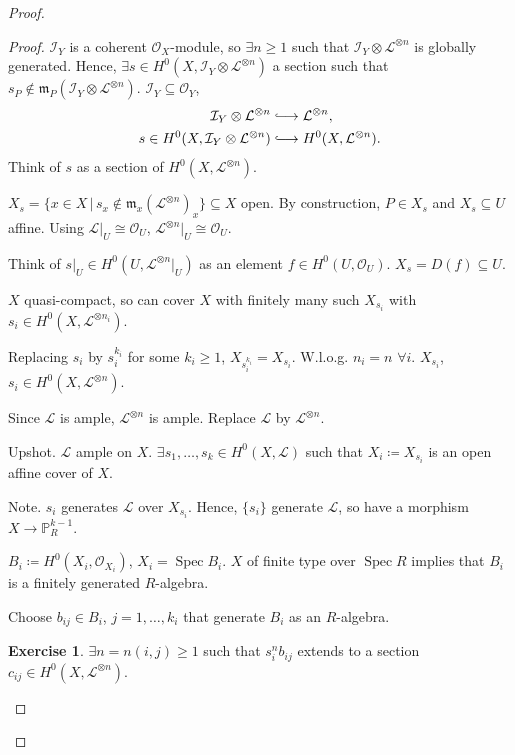 \documentclass[12pt]{article}
\DeclareMathOperator{\Spec}{Spec}
\theoremstyle{definition}
\newtheorem*{exercise}{Exercise}
\begin{document}
\begin{proof}
\begin{proof}
$\mathcal I_Y$ is a coherent $\mathcal O_X$-module, so $\exists n\geq1$ such that $\mathcal I_Y\otimes\mathcal L^{\otimes n}$ is globally generated. Hence, $\exists s\in H^0(X,\mathcal I_Y\otimes\mathcal L^{\otimes n})$ a section such that $s_P\notin\mathfrak m_P(\mathcal I_Y\otimes\mathcal L^{\otimes n})$. $\mathcal I_Y\subseteq\mathcal O_Y$,
\begin{align*}
\mathcal I_Y\otimes\mathcal L^{\otimes n}&\lhook\joinrel\longrightarrow\mathcal L^{\otimes n},\\s\in H^0(X,\mathcal I_Y\otimes\mathcal L^{\otimes n})&\lhook\joinrel\longrightarrow H^0(X,\mathcal L^{\otimes n}).
\end{align*}
Think of $s$ as a section of $H^0(X,\mathcal L^{\otimes n})$.

$X_s=\{x\in X\,|\,s_x\notin\mathfrak m_x(\mathcal L^{\otimes n})_x\}\subseteq X$ open. By construction, $P\in X_s$ and $X_s\subseteq U$ affine. Using $\mathcal L|_U\cong\mathcal O_U$, $\mathcal L^{\otimes n}|_U\cong\mathcal O_U$.

Think of $s|_U\in H^0(U,\mathcal L^{\otimes n}|_U)$ as an element $f\in H^0(U,\mathcal O_U)$. $X_s=D(f)\subseteq U$.

$X$ quasi-compact, so can cover $X$ with finitely many such $X_{s_i}$ with $s_i\in H^0(X,\mathcal L^{\otimes n_i})$.

Replacing $s_i$ by $s_i^{k_i}$ for some $k_i\geq1$, $X_{s_i^{k_i}}=X_{s_i}$. W.l.o.g. $n_i=n$ $\forall i$. $X_{s_i}$, $s_i\in H^0(X,\mathcal L^{\otimes n})$.

Since $\mathcal L$ is ample, $\mathcal L^{\otimes n}$ is ample. Replace $\mathcal L$ by $\mathcal L^{\otimes n}$.

Upshot. $\mathcal L$ ample on $X$. $\exists s_1,\ldots,s_k\in H^0(X,\mathcal L)$ such that $X_i\coloneqq X_{s_i}$ is an open affine cover of $X$.

Note. $s_i$ generates $\mathcal L$ over $X_{s_i}$. Hence, $\{s_i\}$ generate $\mathcal L$, so have a morphism $X\rightarrow\mathbb P_R^{k-1}$.

$B_i\coloneqq H^0(X_i,\mathcal O_{X_i})$, $X_i=\Spec B_i$. $X$ of finite type over $\Spec R$ implies that $B_i$ is a finitely generated $R$-algebra.

Choose $b_{ij}\in B_i$, $j=1,\ldots,k_i$ that generate $B_i$ as an $R$-algebra.

\begin{exercise}
$\exists n=n(i,j)\geq1$ such that $s_i^nb_{ij}$ extends to a section $c_{ij}\in H^0(X,\mathcal L^{\otimes n})$.
\end{exercise}


\end{proof}
\end{proof}
\end{document}
